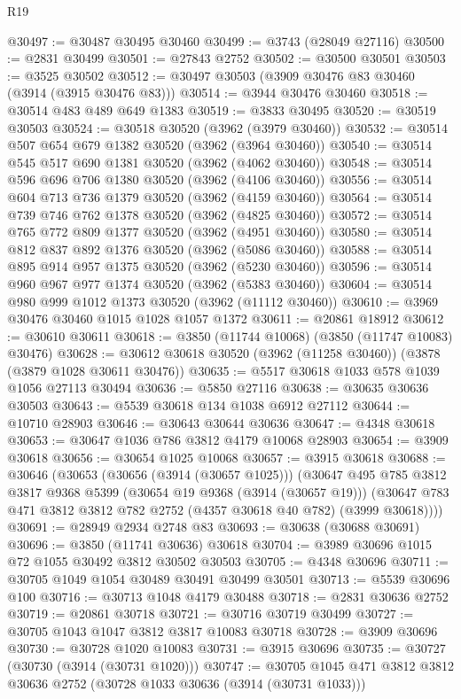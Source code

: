 \begin{lexlean}{R19}
\begin{coremodule}
@30497 := @30487 @30495 @30460
@30499 := @3743 (@28049 @27116)
@30500 := @2831 @30499
@30501 := @27843 @2752
@30502 := @30500 @30501
@30503 := @3525 @30502
@30512 := @30497 @30503 (@3909 @30476 @83 @30460 (@3914 (@3915 @30476 @83)))
@30514 := @3944 @30476 @30460
@30518 := @30514 @483 @489 @649 @1383
@30519 := @3833 @30495
@30520 := @30519 @30503
@30524 := @30518 @30520 (@3962 (@3979 @30460))
@30532 := @30514 @507 @654 @679 @1382 @30520 (@3962 (@3964 @30460))
@30540 := @30514 @545 @517 @690 @1381 @30520 (@3962 (@4062 @30460))
@30548 := @30514 @596 @696 @706 @1380 @30520 (@3962 (@4106 @30460))
@30556 := @30514 @604 @713 @736 @1379 @30520 (@3962 (@4159 @30460))
@30564 := @30514 @739 @746 @762 @1378 @30520 (@3962 (@4825 @30460))
@30572 := @30514 @765 @772 @809 @1377 @30520 (@3962 (@4951 @30460))
@30580 := @30514 @812 @837 @892 @1376 @30520 (@3962 (@5086 @30460))
@30588 := @30514 @895 @914 @957 @1375 @30520 (@3962 (@5230 @30460))
@30596 := @30514 @960 @967 @977 @1374 @30520 (@3962 (@5383 @30460))
@30604 := @30514 @980 @999 @1012 @1373 @30520 (@3962 (@11112 @30460))
@30610 := @3969 @30476 @30460 @1015 @1028 @1057 @1372
@30611 := @20861 @18912
@30612 := @30610 @30611
@30618 := @3850 (@11744 @10068) (@3850 (@11747 @10083) @30476)
@30628 := @30612 @30618 @30520 (@3962 (@11258 @30460)) (@3878 (@3879 @1028 @30611 @30476))
@30635 := @5517 @30618 @1033 @578 @1039 @1056 @27113 @30494
@30636 := @5850 @27116
@30638 := @30635 @30636 @30503
@30643 := @5539 @30618 @134 @1038 @6912 @27112
@30644 := @10710 @28903
@30646 := @30643 @30644 @30636
@30647 := @4348 @30618
@30653 := @30647 @1036 @786 @3812 @4179 @10068 @28903
@30654 := @3909 @30618
@30656 := @30654 @1025 @10068
@30657 := @3915 @30618
@30688 := @30646
    (@30653
      (@30656 (@3914 (@30657 @1025)))
      (@30647
        @495
        @785
        @3812
        @3817
        @9368
        @5399
        (@30654 @19 @9368 (@3914 (@30657 @19)))
        (@30647 @783 @471 @3812 @3812 @782 @2752 (@4357 @30618 @40 @782) (@3999 @30618))))
@30691 := @28949 @2934 @2748 @83
@30693 := @30638 (@30688 @30691)
@30696 := @3850 (@11741 @30636) @30618
@30704 := @3989 @30696 @1015 @72 @1055 @30492 @3812 @30502 @30503
@30705 := @4348 @30696
@30711 := @30705 @1049 @1054 @30489 @30491 @30499 @30501
@30713 := @5539 @30696 @100
@30716 := @30713 @1048 @4179 @30488
@30718 := @2831 @30636 @2752
@30719 := @20861 @30718
@30721 := @30716 @30719 @30499
@30727 := @30705 @1043 @1047 @3812 @3817 @10083 @30718
@30728 := @3909 @30696
@30730 := @30728 @1020 @10083
@30731 := @3915 @30696
@30735 := @30727 (@30730 (@3914 (@30731 @1020)))
@30747 := @30705 @1045 @471 @3812 @3812 @30636 @2752 (@30728 @1033 @30636 (@3914 (@30731 @1033)))

\end{coremodule}
\end{lexlean}
